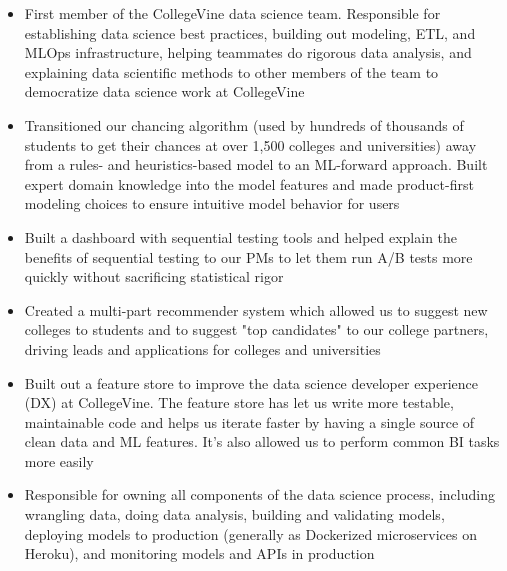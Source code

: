 \documentclass[10pt,a4paper,ragged2e,withhyper]{/Users/matt/documents/GitHub/mrkaye97.github.io/resume/altacv}
\begin{document}
	\begin{paracol}{1}
	
		\begin{itemize}
		\item First member of the CollegeVine data science team. Responsible for establishing data science best practices, building out modeling, ETL, and MLOps infrastructure, helping teammates do rigorous data analysis, and explaining data scientific methods to other members of the team to democratize data science work at CollegeVine
		\item Transitioned our chancing algorithm (used by hundreds of thousands of students to get their chances at over 1,500 colleges and universities) away from a rules- and heuristics-based model to an ML-forward approach. Built expert domain knowledge into the model features and made product-first modeling choices to ensure intuitive model behavior for users
		\item Built a dashboard with sequential testing tools and helped explain the benefits of sequential testing to our PMs to let them run A/B tests more quickly without sacrificing statistical rigor
		\item Created a multi-part recommender system which allowed us to suggest new colleges to students and to suggest "top candidates" to our college partners, driving leads and applications for colleges and universities
		\item Built out a feature store to improve the data science developer experience (DX) at CollegeVine. The feature store has let us write more testable, maintainable code and helps us iterate faster by having a single source of clean data and ML features. It's also allowed us to perform common BI tasks more easily
		\item Responsible for owning all components of the data science process, including wrangling data, doing data analysis, building and validating models, deploying models to production (generally as Dockerized microservices on Heroku), and monitoring models and APIs in production
		\end{itemize}
		
		\divider
		
		

\end{paracol}
\end{document}
